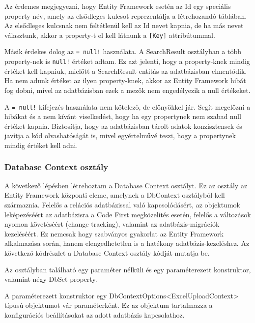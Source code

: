 \documentclass[
]{thesis-ekf}
\theoremstyle{definition}
\theoremstyle{remark}
\begin{document}
	
Az érdemes megjegyezni, hogy Entity Framework esetén az Id egy speciális property név, amely az elsődleges kulcsot reprezentálja a létrehozandó táblában. Az elsődleges kulcsnak nem feltétlenül kell az Id nevet kapnia, de ha más nevet választunk, akkor a property-t el kell látnunk a \texttt{[Key]} attribútummal.

Másik érdekes dolog az \texttt{= null!} használata. A SearchResult osztályban a több property-nek is \texttt{null!} értéket adtam. Ez azt jelenti, hogy a property-knek mindig értéket kell kapniuk, mielőtt a SearchResult entitás az adatbázisban elmentődik. Ha nem adunk értéket az ilyen property-knek, akkor az Entity Framework hibát fog dobni, mivel az adatbázisban ezek a mezők nem engedélyezik a null értékeket.

A \texttt{= null!} kifejezés használata nem kötelező, de előnyökkel jár. Segít megelőzni a hibákat és a nem kívánt viselkedést, hogy ha egy propertynek nem szabad null értéket kapnia. Biztosítja, hogy az adatbázisban tárolt adatok konzisztensek és javítja a kód olvashatóságát is, mivel egyértelművé teszi, hogy a propertynek mindig értéket kell adni.

\subsubsection{Database Context osztály}
A következő lépésben létrehoztam a Database Context osztályt. Ez az osztály az Entity Framework központi eleme, amelynek a DbContext osztályból kell származnia. Felelős a relációs adatbázissal való kapcsolódásért, az objektumok leképezéséért az adatbázisra a Code First megközelítés esetén, felelős a változások nyomon követéséért (change tracking), valamint az adatbázis-migrációk kezeléséért. Ez nemcsak hogy szabványos gyakorlat az Entity Framework alkalmazása során, hanem elengedhetetlen is a hatékony adatbázis-kezeléshez. Az következő kódrészlet a  Database Context osztály kódját mutatja be.


Az osztályban található egy paraméter nélküli és egy paraméterezett konstruktor, valamint négy DbSet property. 

A paraméterezett konstruktor egy DbContextOptions<ExcelUploadContext> típusú objektumot vár paraméterként. Ez az objektum tartalmazza a konfigurációs beállításokat az adott adatbázis kapcsolathoz.
\end{document}
